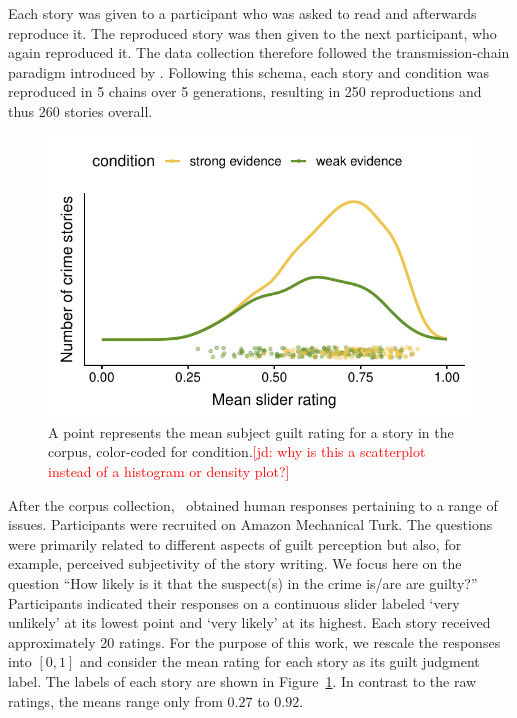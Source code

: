 \documentclass[11pt,a4paper]{article}
\newcommand{\jd}[1]{\textcolor{Red}{[jd: #1]}}
\begin{document}
Each story was given to a participant who was asked to read and afterwards reproduce it. The reproduced story was then given to the next participant, who again reproduced it. The data collection therefore followed the transmission-chain paradigm introduced by \citet{Bartlett:1932}. Following this schema, each story and condition was reproduced in 5 chains over 5 generations, resulting in 250 reproductions and thus 260 stories overall.

\begin{figure}[tp]
  \includegraphics[width=\linewidth]{graphs/subjguilt.pdf}
  \caption{A point represents the mean subject guilt rating for a story in the corpus,
    color-coded for condition.\jd{why is this a scatterplot instead of a histogram or density plot?}}
  \label{fig:corpus-annotations}
\end{figure}

After the corpus collection, \citeauthor{Kreiss:2019}\ obtained human responses pertaining to a range of issues. Participants were recruited on Amazon Mechanical Turk. The questions were primarily related to different aspects of guilt perception but also, for example, perceived subjectivity of the story writing. We focus here on the question ``How likely is it that the suspect(s) in the crime is/are are guilty?'' Participants indicated their responses on a continuous slider labeled `very unlikely' at its lowest point and `very likely' at its highest. Each story received approximately 20 ratings. For the purpose of this work, we rescale the responses into $[0,1]$ and consider the mean rating for each story as its guilt judgment label. The labels of each story are shown in Figure~\ref{fig:corpus-annotations}. In contrast to the raw ratings, the means range only from $0.27$ to $0.92$. 
\end{document}
